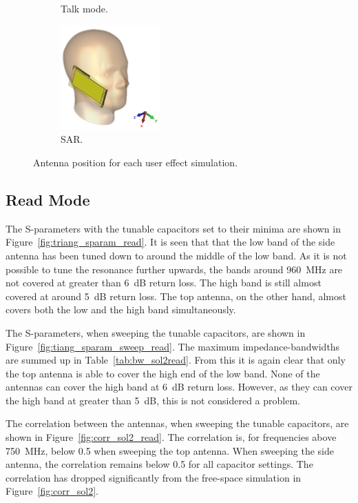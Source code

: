 \begin{figure}[htbp]
\begin{subfigure}[b]{0.24\linewidth}
        \caption{Talk mode.}
    \end{subfigure}
    \begin{subfigure}[b]{0.24\linewidth}
        \centering
        \includegraphics[width=\linewidth,height=4cm,keepaspectratio]{img/tech_sol/trianglefeed/sar/3d.PNG}
        \caption{SAR.}
    \end{subfigure}
    \caption{Antenna position for each user effect simulation.}
    \label{fig:triang_positions}
\end{figure}

\FloatBarrier
\subsection{Read Mode}
The S-parameters with the tunable capacitors set to their minima are shown in Figure~\ref{fig:triang_sparam_read}. It is seen that that the low band of the side antenna has been tuned down to around the middle of the low band. As it is not possible to tune the resonance further upwards, the bands around \SI{960}{MHz} are not covered at greater than \SI{6}{dB} return loss. The high band is still almost covered at around \SI{5}{dB} return loss. The top antenna, on the other hand, almost covers both the low and the high band simultaneously.

The S-parameters, when sweeping the tunable capacitors, are shown in Figure~\ref{fig:tiang_sparam_sweep_read}. The maximum impedance-bandwidths are summed up in Table~\ref{tab:bw_sol2read}. From this it is again clear that only the top antenna is able to cover the high end of the low band. None of the antennas can cover the high band at \SI{6}{dB} return loss. However, as they can cover the high band at greater than \SI{5}{dB}, this is not considered a problem.

The correlation between the antennas, when sweeping the tunable capacitors, are shown in Figure~\ref{fig:corr_sol2_read}. The correlation is, for frequencies above \SI{750}{MHz}, below 0.5 when sweeping the top antenna. When sweeping the side antenna, the correlation remains below 0.5 for all capacitor settings. The correlation has dropped significantly from the free-space simulation in Figure~\ref{fig:corr_sol2}.

